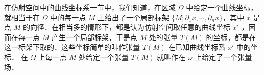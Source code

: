 
在仿射空间中的曲线坐标系一节中，我们知道，在区域 $\Omega$ 中给定一个曲线坐标，就相当于在 $\Omega$ 中的每一点 $M$ 上给出了一个局部标架 $\{M;\partial_1 x,\cdots,\partial_n x\}$，其中 $x$ 是点 $M$ 的向径．在相当多的情形下，都是认为仿射空间取任意的曲线坐标 $x^i$ ，因而在每一点 $M$ 产生一个局部标架，于是点 $M$ 处的张量 $T(M)$ 的坐标，都是在这一标架下取的．这些坐标简单的叫作张量 $T(M)$ 在已知曲线坐标系 $x^i$ 中的坐标． 在 $\Omega$ 上每一点 $M$ 处给定一个张量 $T(M)$ 就叫作在 $\omega$ 上给定了一个张量场．

